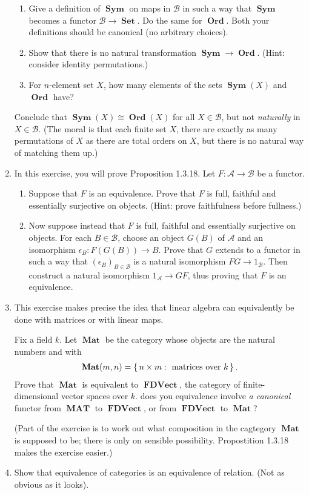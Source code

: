 \documentclass[12pt,a4paper]{report}
\newcommand{\CAT}[1]{\mathscr{#1}}
\newcommand{\CATSET}[1]{\operatorname{\textbf{#1}}}
\begin{document}
\begin{enumerate}[label=1.3.\arabic*]
\begin{enumerate}
	\item Give a definition of $\CATSET{Sym}$ on maps in $\CAT{B}$ in such a way that $\CATSET{Sym}$ becomes a functor $\CAT{B}\to \CATSET{Set}$.  Do the same for $\CATSET{Ord}$.  Both your definitions should be canonical (no arbitrary choices).
	\item Show that there is no natural transformation $\CATSET{Sym}\to \CATSET{Ord}$.  (Hint: consider identity permutations.)
	\item For $n$-element set $X$, how many elements of the sets $\CATSET{Sym}(X)$ and $\CATSET{Ord}$ have?
\end{enumerate}
Conclude that $\CATSET{Sym}(X)\cong \CATSET{Ord}(X)$ for all $X \in \CAT{B}$, but not \textit{naturally} in $X \in \CAT{B}$.  (The moral is that each finite set $X$, there are exactly as many permutations of $X$ as there are total orders on $X$, but there is no natural way of matching them up.)

\item In this exercise, you will prove Proposition 1.3.18.  Let $F: \CAT{A} \to \CAT{B}$ be a functor.
\begin{enumerate}
	\item Suppose that $F$ is an equivalence.  Prove that $F$ is full, faithful and essentially surjective on objects.  (Hint: prove faithfulness before fullness.)
	\item Now suppose instead that $F$ is full, faithful and essentially surjective on objects.  For each $B \in \CAT{B}$, choose an object $G(B)$ of $\CAT{A}$ and an isomorphism $\epsilon_B:F(G(B)) \to B$.  Prove that $G$  extends to a functor in such a way that $(\epsilon_B)_{B \in \CAT{B}}$ is a natural isomorphism $FG \to 1_{\CAT{B}}$.  Then construct a natural isomorphism $1_{\CAT{A}} \to GF$, thus proving that $F$ is an equivalence.
\end{enumerate}

\item This exercise makes precise the idea that linear algebra can equivalently be done with matrices or with linear maps.

Fix a field $k$. Let $\CATSET{Mat}$ be the category whose objects are the natural numbers and with 
\begin{align*}
	\CATSET{Mat}(m,n)=\BRACKET{n\times m: \text{ matrices over }k}.
\end{align*}Prove that $\CATSET{Mat}$ is equivalent to $\CATSET{FDVect}$, the category of finite-dimensional vector spaces over $k$. does you equivalence involve \textit{a canonical} functor from $\CATSET{MAT}$ to $\CATSET{FDVect}$, or from $\CATSET{FDVect}$ to $\CATSET{Mat}$?

(Part of the exercise is to work out what composition in the cagtegory $\CATSET{Mat}$ is supposed to be; there is only on sensible possibility.  Propostition 1.3.18 makes the exercise easier.)

\item Show that equivalence of categories is an equivalence of relation.  (Not as obvious as it looks).
\end{enumerate}
\end{document}

